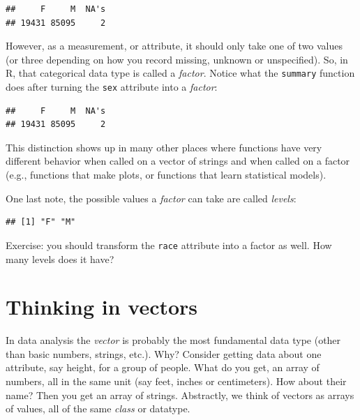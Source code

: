 \documentclass[12pt,]{book}
\newenvironment{Shaded}{\begin{snugshade}}{\end{snugshade}}
\newcommand{\KeywordTok}[1]{\textcolor[rgb]{0.13,0.29,0.53}{\textbf{#1}}}
\newcommand{\StringTok}[1]{\textcolor[rgb]{0.31,0.60,0.02}{#1}}
\newcommand{\OperatorTok}[1]{\textcolor[rgb]{0.81,0.36,0.00}{\textbf{#1}}}
\newcommand{\NormalTok}[1]{#1}
\theoremstyle{definition}
\theoremstyle{definition}
\theoremstyle{definition}
\theoremstyle{remark}
\begin{document}
\begin{verbatim}
##     F     M  NA's 
## 19431 85095     2
\end{verbatim}

However, as a measurement, or attribute, it should only take one of two
values (or three depending on how you record missing, unknown or
unspecified). So, in R, that categorical data type is called a
\emph{factor}. Notice what the \texttt{summary} function does after
turning the \texttt{sex} attribute into a \emph{factor}:

\begin{Shaded}
\end{Shaded}

\begin{verbatim}
##     F     M  NA's 
## 19431 85095     2
\end{verbatim}

This distinction shows up in many other places where functions have very
different behavior when called on a vector of strings and when called on
a factor (e.g., functions that make plots, or functions that learn
statistical models).

One last note, the possible values a \emph{factor} can take are called
\emph{levels}:

\begin{Shaded}
\end{Shaded}

\begin{verbatim}
## [1] "F" "M"
\end{verbatim}

Exercise: you should transform the \texttt{race} attribute into a factor
as well. How many levels does it have?

\section{Thinking in vectors}\label{thinking-in-vectors}

In data analysis the \emph{vector} is probably the most fundamental data
type (other than basic numbers, strings, etc.). Why? Consider getting
data about one attribute, say height, for a group of people. What do you
get, an array of numbers, all in the same unit (say feet, inches or
centimeters). How about their name? Then you get an array of strings.
Abstractly, we think of vectors as arrays of values, all of the same
\emph{class} or datatype.
\end{document}
